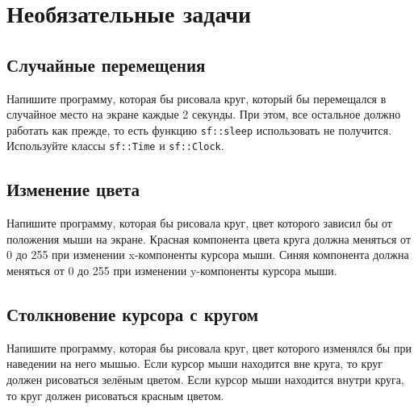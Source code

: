 \documentclass{article}
\begin{document}
\section{Необязательные задачи}


\subsection{Случайные перемещения}
Напишите программу, которая бы рисовала круг, который бы перемещался в случайное место на экране каждые 2 секунды. При этом, все остальное должно работать как прежде, то есть функцию \texttt{sf::sleep} использовать не получится. Используйте классы \texttt{sf::Time} и \texttt{sf::Clock}.


\subsection{Изменение цвета}
Напишите программу, которая бы рисовала круг, цвет которого зависил бы от положения мыши на экране.
Красная компонента цвета круга должна меняться от 0 до 255 при изменении x-компоненты курсора мыши.
Синяя компонента должна меняться от 0 до 255 при изменении y-компоненты курсора мыши.



\subsection{Столкновение курсора с кругом}
Напишите программу, которая бы рисовала круг, цвет которого изменялся бы при наведении на него мышью. Если курсор мыши находится вне круга, то круг должен рисоваться зелёным цветом. Если курсор мыши находится внутри круга, то круг должен рисоваться красным цветом.
\end{document}

